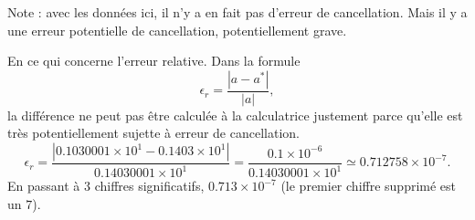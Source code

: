 \begin{example}
	Note : avec les données ici, il n'y a en fait pas d'erreur de cancellation. Mais il y a une erreur potentielle de cancellation, potentiellement grave.

	En ce qui concerne l'erreur relative. Dans la formule
	\begin{equation}
		\epsilon_r=\frac{ | a-a^* | }{ | a | },
	\end{equation}
	la différence ne peut pas être calculée à la calculatrice justement parce qu'elle est très potentiellement sujette à erreur de cancellation.
	\begin{equation}
		\epsilon_r=\frac{ | 0.1030001\times 10^1-0.1403\times 10^1 | }{ 0.14030001\times 10^1 }=\frac{ 0.1\times 10^{-6} }{ 0.14030001\times 10^1 }\simeq 0.712758\times 10^{-7}.
	\end{equation}
	En passant à \( 3\) chiffres significatifs, \( 0.713\times 10^{-7}\) (le premier chiffre supprimé est un \( 7\)).

\end{example}

